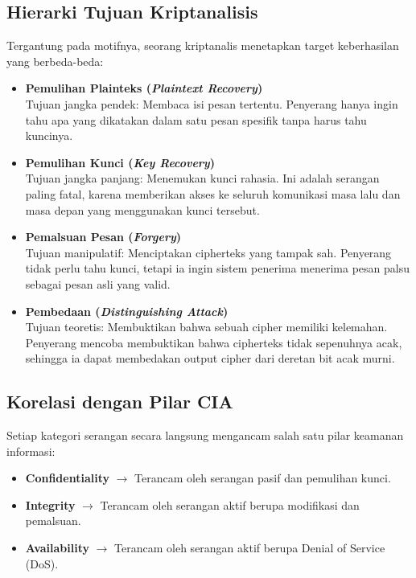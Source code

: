 \subsection{Hierarki Tujuan Kriptanalisis}

Tergantung pada motifnya, seorang kriptanalis menetapkan target keberhasilan yang berbeda-beda:

\begin{itemize}
    \item \textbf{Pemulihan Plainteks (\textit{Plaintext Recovery})} \\
    Tujuan jangka pendek: Membaca isi pesan tertentu. Penyerang hanya ingin tahu apa yang dikatakan dalam satu pesan spesifik tanpa harus tahu kuncinya.

    \item \textbf{Pemulihan Kunci (\textit{Key Recovery})} \\
    Tujuan jangka panjang: Menemukan kunci rahasia. Ini adalah serangan paling fatal, karena memberikan akses ke seluruh komunikasi masa lalu dan masa depan yang menggunakan kunci tersebut.

    \item \textbf{Pemalsuan Pesan (\textit{Forgery})} \\
    Tujuan manipulatif: Menciptakan cipherteks yang tampak sah. Penyerang tidak perlu tahu kunci, tetapi ia ingin sistem penerima menerima pesan palsu sebagai pesan asli yang valid.

    \item \textbf{Pembedaan (\textit{Distinguishing Attack})} \\
    Tujuan teoretis: Membuktikan bahwa sebuah cipher memiliki kelemahan. Penyerang mencoba membuktikan bahwa cipherteks tidak sepenuhnya acak, sehingga ia dapat membedakan output cipher dari deretan bit acak murni.
\end{itemize}

\subsection{Korelasi dengan Pilar CIA}

Setiap kategori serangan secara langsung mengancam salah satu pilar keamanan informasi:
\begin{itemize}
    \item \textbf{Confidentiality} $\rightarrow$ Terancam oleh serangan pasif dan pemulihan kunci.
    \item \textbf{Integrity} $\rightarrow$ Terancam oleh serangan aktif berupa modifikasi dan pemalsuan.
    \item \textbf{Availability} $\rightarrow$ Terancam oleh serangan aktif berupa Denial of Service (DoS).
\end{itemize}
